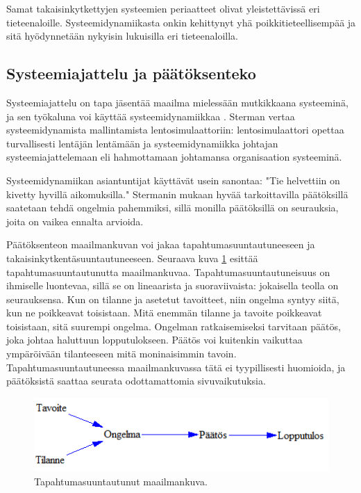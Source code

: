 \documentclass[finnish,12pt,a4paper,pdftex]{article}
\begin{document}
\begin{onehalfspacing}
Samat takaisinkytkettyjen systeemien periaatteet olivat yleistettävissä eri tieteenaloille. Systeemidynamiikasta onkin kehittynyt yhä poikkitieteellisempää ja sitä hyödynnetään nykyisin lukuisilla eri tieteenaloilla. \cite{Forrester1968, Sterman2000, WhatIsSystemDynamics} %



\subsection{Systeemiajattelu ja päätöksenteko \label{sysdyn:paatos}}

Systeemiajattelu on tapa jäsentää maailma mielessään mutkikkaana systeeminä, ja sen työkaluna voi käyttää systeemidynamiikkaa \cite[s. 4--5]{Sterman2000}. Sterman \cite[s. 4--5]{Sterman2000} vertaa systeemidynamista mallintamista lentosimulaattoriin: lentosimulaattori opettaa turvallisesti lentäjän lentämään ja systeemidynamiikka johtajan systeemiajattelemaan eli hahmottamaan johtamansa organisaation systeeminä. 

Systeemidynamiikan asiantuntijat käyttävät usein sanontaa: "Tie helvettiin on kivetty hyvillä aikomuksilla." Stermanin \cite[s. 5--6]{Sterman2000} mukaan hyvää tarkoittavilla päätöksillä saatetaan tehdä ongelmia pahemmiksi, sillä monilla päätöksillä on seurauksia, joita on vaikea ennalta arvioida. %

Päätöksenteon maailmankuvan voi jakaa tapahtumasuuntautuneeseen ja takaisinkytkentäsuuntautuneeseen. Seuraava kuva \ref{sysdyn:tapahtumasuuntautunut} esittää tapahtumasuuntautunutta maailmankuvaa. Tapahtumasuuntautuneisuus on ihmiselle luontevaa, sillä se on lineaarista ja suoraviivaista: jokaisella teolla on seurauksensa. Kun on tilanne ja asetetut tavoitteet, niin ongelma syntyy siitä, kun ne poikkeavat toisistaan. Mitä enemmän tilanne ja tavoite poikkeavat toisistaan, sitä suurempi ongelma. Ongelman ratkaisemiseksi tarvitaan päätös, joka johtaa haluttuun lopputulokseen. Päätös voi kuitenkin vaikuttaa ympäröivään tilanteeseen mitä moninaisimmin tavoin. Tapahtumasuuntautuneessa maailmankuvassa tätä ei tyypillisesti huomioida, ja päätöksistä saattaa seurata odottamattomia sivuvaikutuksia. \cite[s. 10]{Sterman2000}

\begin{figure}[H]
\centering \includegraphics{tapahtuma}
\caption{Tapahtumasuuntautunut maailmankuva. \cite[s. 10]{Sterman2000} \label{sysdyn:tapahtumasuuntautunut}}
\end{figure}


\end{onehalfspacing}
\end{document}
